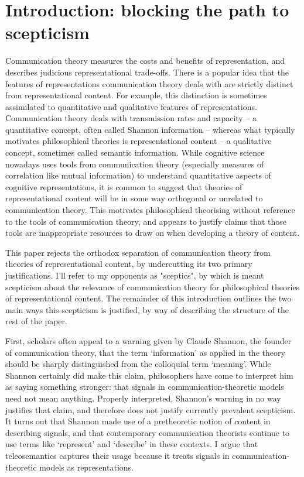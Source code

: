 \section{Introduction: blocking the path to scepticism}\label{sec:intro}

Communication theory measures the costs and benefits of representation, and describes judicious representational trade-offs. 
There is a popular idea that the features of representations communication theory deals with are strictly distinct from representational content.
For example, this distinction is sometimes assimilated to quantitative and qualitative features of representations.
Communication theory deals with transmission rates and capacity -- a quantitative concept, often called Shannon information -- whereas what typically motivates philosophical theories is representational content -- a qualitative concept, sometimes called semantic information.
While cognitive science nowadays uses tools from communication theory (especially measures of correlation like mutual information) to understand quantitative aspects of cognitive representations, it is common to suggest that theories of representational content will be in some way orthogonal or unrelated to communication theory.
This motivates philosophical theorising without reference to the tools of communication theory, and appears to justify claims that those tools are inappropriate resources to draw on when developing a theory of content.

This paper rejects the orthodox separation of communication theory from theories of representational content, by undercutting its two primary justifications.
I'll refer to my opponents as "sceptics", by which is meant scepticism about the relevance of communication theory for philosophical theories of representational content.
The remainder of this introduction outlines the two main ways this scepticism is justified, by way of describing the structure of the rest of the paper.

First, scholars often appeal to a warning given by Claude Shannon, the founder of communication theory, that the term `information' as applied in the theory should be sharply distinguished from the colloquial term `meaning'.
While Shannon certainly did make this claim, philosophers have come to interpret him as saying something stronger: that signals in communication-theoretic models need not mean anything.
Properly interpreted, Shannon's warning in no way justifies that claim, and therefore does not justify currently prevalent scepticism.
It turns out that Shannon made use of a pretheoretic notion of content in describing signals, and that contemporary communication theorists continue to use terms like `represent' and `describe' in these contexts.
I argue that teleosemantics captures their usage because it treats signals in communication-theoretic models as representations.

